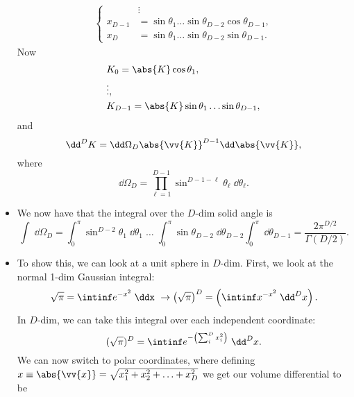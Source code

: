 \begin{itemize}
\begin{equation*}
\begin{alignedat}{1}
\begin{cases}
                &\vdots \\
                x_{D-1} &= \sin\theta_1 \ldots \sin\theta_{D-2}\cos\theta_{D-1}, \\
                x_D &= \sin\theta_1 \ldots \sin\theta_{D-2}\sin\theta_{D-1}.
            \end{cases}
            \end{alignedat}
        \end{equation*}
        Now
        \begin{align*}
            &K_0 = \abs{K}\cos\theta_1, \\
            &\vdots, \\
            &K_{D-1} = \abs{K}\sin\theta_1 \ldots \sin\theta_{D-1},
        \end{align*}
        and 
        \begin{equation*}
            \dd^DK = \dd\Omega_D \abs{\vv{K}}^{D-1}\dd\abs{\vv{K}},
        \end{equation*}
        where
        \begin{equation*}
            \dd\Omega_D = \prod_{\ell=1}^{D-1} \sin^{D-1-\ell}\theta_{\ell} \;\dd\theta_{\ell}.
        \end{equation*}
    \item We now have that the integral over the $D$-dim solid angle is
        \begin{equation*}
            \int \;\dd\Omega_D = \int_0^{\pi} \sin^{D-2}\theta_1 \;\dd\theta_1 \;\ldots\; \int_0^{\pi} \sin\theta_{D-2} \;\dd\theta_{D-2} \int_0^{\pi} \;\dd\theta_{D-1} = \frac{2 \pi^{D/2}}{\Gamma(D/2)}.
        \end{equation*}
    \item To show this, we can look at a unit sphere in $D$-dim. First, we look at the normal 1-dim Gaussian integral:
        \begin{equation*}
            \sqrt{\pi} = \intinf e^{-x^2} \;\ddx \ \rightarrow \left( \sqrt{\pi} \right)^D = \left( \intinf x^{-x^2}\;\dd^Dx \right).
        \end{equation*}
        In $D$-dim, we can take this integral over each independent coordinate:
        \begin{equation*}
            (\sqrt{\pi})^D = \intinf e^{-\left( \sum_i^D x_i^2 \right)} \;\dd^Dx.
        \end{equation*}
        We can now switch to polar coordinates, where defining $x \equiv \abs{\vv{x}} = \sqrt{x_1^2 + x_2^2 + \ldots + x_D^2}$ we get our volume differential to be
        \begin{equation*}

\end{equation*}
\end{itemize}
